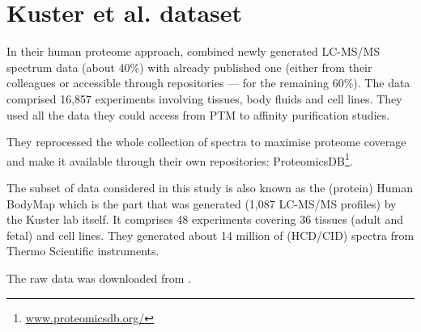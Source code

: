 \chapter{Kuster et al. dataset}
\label{ch:kusterData}


In their human proteome approach,
\cite{KusterData} combined newly generated \gls{LC-MS/MS} spectrum
data (about 40\%) with already published one
(either from their colleagues or accessible through repositories ---
for the remaining 60\%).
The data comprised 16,857 experiments involving tissues, body fluids and cell
lines. They used all the data they could access from \gls{PTM} to affinity
purification studies.

They reprocessed the whole collection of spectra to maximise proteome coverage
and make it available through their own repositories: ProteomicsDB\footnote{%
\href{https://www.proteomicsdb.org/}{www.proteomicsdb.org/}}.

The subset of data considered in this study is also
known as the (protein) Human BodyMap
which is the part that was generated (1,087 \gls{LC-MS/MS} profiles)
by the Kuster lab itself.
It comprises 48 experiments covering 36 tissues
(adult and fetal) and cell lines.
They generated about 14 million of (\gls{HCD}/\gls{CID}) spectra from Thermo
Scientific instruments.

The raw data was downloaded from .



